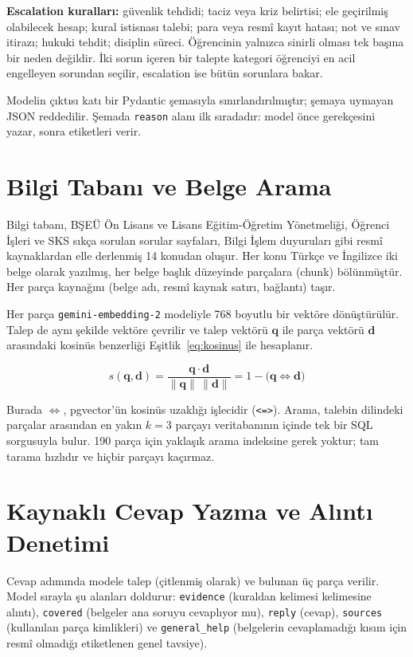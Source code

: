 \textbf{Escalation kuralları:} güvenlik tehdidi; taciz veya kriz belirtisi; ele geçirilmiş olabilecek
hesap; kural istisnası talebi; para veya resmî kayıt hatası; not ve sınav itirazı; hukuki tehdit;
disiplin süreci. Öğrencinin yalnızca sinirli olması tek başına bir neden değildir. İki sorun içeren
bir talepte kategori öğrenciyi en acil engelleyen sorundan seçilir, escalation ise bütün sorunlara bakar.

Modelin çıktısı katı bir Pydantic şemasıyla sınırlandırılmıştır; şemaya uymayan JSON reddedilir.
Şemada \texttt{reason} alanı ilk sıradadır: model önce gerekçesini yazar, sonra etiketleri verir.

\section{Bilgi Tabanı ve Belge Arama}

Bilgi tabanı, BŞEÜ Ön Lisans ve Lisans Eğitim-Öğretim Yönetmeliği, Öğrenci İşleri ve SKS sıkça
sorulan sorular sayfaları, Bilgi İşlem duyuruları gibi resmî kaynaklardan elle derlenmiş 14 konudan
oluşur. Her konu Türkçe ve İngilizce iki belge olarak yazılmış, her belge başlık düzeyinde parçalara
(chunk) bölünmüştür. Her parça kaynağını (belge adı, resmî kaynak satırı, bağlantı) taşır.

Her parça \texttt{gemini-embedding-2} modeliyle 768 boyutlu bir vektöre dönüştürülür. Talep de aynı
şekilde vektöre çevrilir ve talep vektörü $\mathbf{q}$ ile parça vektörü $\mathbf{d}$ arasındaki
kosinüs benzerliği Eşitlik~\ref{eq:kosinus} ile hesaplanır.

\begin{equation}
  s(\mathbf{q},\mathbf{d}) = \frac{\mathbf{q}\cdot\mathbf{d}}{\lVert\mathbf{q}\rVert\,\lVert\mathbf{d}\rVert}
  = 1 - \bigl(\mathbf{q} \Leftrightarrow \mathbf{d}\bigr)
  \label{eq:kosinus}
\end{equation}

Burada $\Leftrightarrow$, pgvector'ün kosinüs uzaklığı işlecidir (\texttt{<=>}). Arama, talebin
dilindeki parçalar arasından en yakın $k = 3$ parçayı veritabanının içinde tek bir SQL sorgusuyla
bulur. 190 parça için yaklaşık arama indeksine gerek yoktur; tam tarama hızlıdır ve hiçbir parçayı
kaçırmaz.

\section{Kaynaklı Cevap Yazma ve Alıntı Denetimi}

Cevap adımında modele talep (çitlenmiş olarak) ve bulunan üç parça verilir. Model sırayla şu alanları
doldurur: \texttt{evidence} (kuraldan kelimesi kelimesine alıntı), \texttt{covered} (belgeler ana
soruyu cevaplıyor mu), \texttt{reply} (cevap), \texttt{sources} (kullanılan parça kimlikleri) ve
\texttt{general\_help} (belgelerin cevaplamadığı kısım için resmî olmadığı etiketlenen genel tavsiye).

